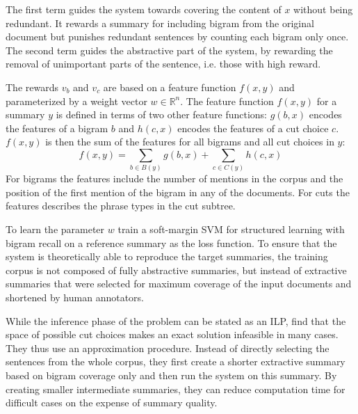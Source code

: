 \documentclass[a4paper,BCOR=10mm]{report}
\numberwithin{lemma}{chapter}
\numberwithin{definition}{chapter}
\begin{document}
The first term guides the system towards covering the content of $x$ without being redundant. It rewards a summary for including bigram from the original document but punishes redundant sentences by counting each bigram only once.
The second term guides the abstractive part of the system, by rewarding the removal of unimportant parts of the sentence, i.e. those with high reward.


The rewards $v_b$ and $v_c$ are based on a feature function $f(x, y)$ and parameterized by a weight vector $w \in \mathbb{R}^n$.
The feature function $f(x, y)$ for a summary $y$ is defined in terms of two other feature functions: $g(b, x)$ encodes the features of a bigram $b$ and $h(c, x)$ encodes the features of a cut choice $c$. $f(x, y)$ is then the sum of the features for all bigrams and all cut choices in $y$:
\begin{equation}
f(x, y) = \sum_{b \in B(y)} g(b, x) + \sum_{c \in C(y)} h(c, x)
\end{equation}
For bigrams the features include the number of mentions in the corpus and the position of the first mention of the bigram in any of the documents.
For cuts the features describes the phrase types in the cut subtree.

To learn the parameter $w$ \citeauthor{berg-kirkpatrick} train a soft-margin SVM for structured learning \citet{svm} with bigram recall on a reference summary as the loss function. To ensure that the system is theoretically able to reproduce the target summaries, the training corpus is not composed of fully abstractive summaries, but instead of extractive summaries that were selected for maximum coverage of the input documents and shortened by human annotators.

While the inference phase of the problem can be stated as an ILP, \citet{berg-kirkpatrick} find that the space of possible cut choices makes an exact solution infeasible in many cases. They thus use an approximation procedure. Instead of directly selecting the sentences from the whole corpus, they first create a shorter extractive summary based on bigram coverage only and then run the system on this summary. By creating smaller intermediate summaries, they can reduce computation time for difficult cases on the expense of summary quality.
\end{document}
